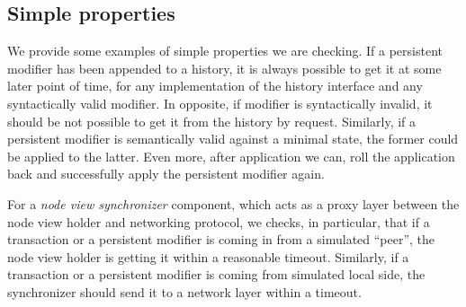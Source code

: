 \subsection{Simple properties}
\label{sec:simple-props}

We provide some examples of simple properties we are checking. If a persistent modifier has been appended to a history, it is always possible to get it at some later point of time, for any implementation of the history interface and any syntactically valid modifier. In opposite, if modifier is syntactically invalid, it should be not possible to get it from the history by request. Similarly, if a persistent modifier is semantically valid against a minimal state, the former could be applied to the latter. Even more, after application we can, roll the application back and successfully apply the persistent modifier again.  

For a {\em node view synchronizer} component, which acts as a proxy layer between the node view holder and networking protocol, we checks, in particular, that if a transaction or a persistent modifier is coming in from a simulated ``peer'', the node view holder is getting it within a reasonable timeout. Similarly, if a transaction or a persistent modifier is coming from simulated local side, the synchronizer should send it to a network layer within a timeout.